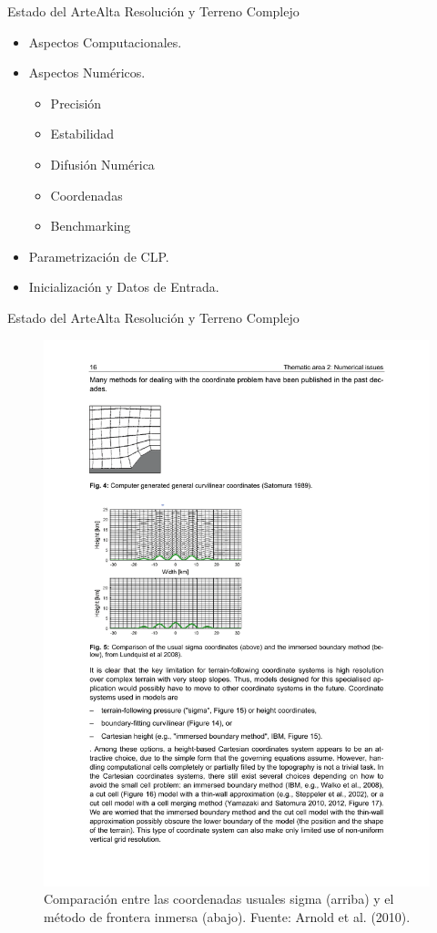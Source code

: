 \documentclass[mathserif]{beamer}
\begin{document}
\begin{frame}{Estado del Arte}{Alta Resolución y Terreno Complejo}
	\begin{itemize}
		\item Aspectos Computacionales.
		\item Aspectos Numéricos.
		\begin{itemize}
			\item Precisión
			\item Estabilidad
			\item Difusión Numérica
			\item Coordenadas
			\item Benchmarking
		\end{itemize}
		\item Parametrización de CLP.
		\item Inicialización y Datos de Entrada.
	\end{itemize}
\end{frame}

\begin{frame}{Estado del Arte}{Alta Resolución y Terreno Complejo}
	\begin{figure}[h!]
		\centering
		\vspace{0.2cm}
		\includegraphics[width=0.75\linewidth,trim={2.6cm 13.5cm 9.2cm 9cm},clip]{fig/02/coordinates}
		\caption{Comparación entre las coordenadas usuales sigma (arriba) y el método de frontera inmersa (abajo). Fuente: Arnold et al. (2010).}
	\end{figure}
\end{frame}
\end{document}
